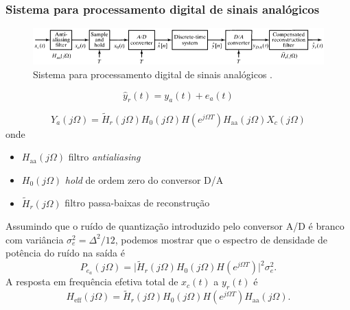 \begin{frame}[allowframebreaks]
  \frametitle{Sistema para processamento digital de sinais analógicos}
  \begin{figure}[h!]
  \centering
  \includegraphics[width=\textwidth]{images/oppenheim_fig441b.png}
  \caption{Sistema para processamento digital de sinais analógicos \citep{oppenheim2009}.}
  \label{fig:oppenheim_fig441b}
  \end{figure}

  \begin{equation}
  \hat{y}_r (t) = y_a (t) + e_a (t)
  \end{equation}
  
  \begin{equation}
  Y_a(j\Omega) = \tilde{H}_r(j\Omega) H_0(j\Omega) H(e^{j\Omega T}) H_{\text{aa}}(j\Omega) X_c(j\Omega) 
  \end{equation}
  onde 
  \begin{itemize}
  \item $H_{\text{aa}}(j\Omega)$ filtro \textit{antialiasing}
  \item $H_0(j\Omega)$ \textit{hold} de ordem zero do conversor D/A 
  \item $\tilde{H}_r(j\Omega)$ filtro passa-baixas de reconstrução 
  \end{itemize}

  
  Assumindo que o ruído de quantização introduzido pelo conversor A/D é branco com
  variância $\sigma_e^2 = \Delta^2/12$, podemos mostrar que o espectro de densidade de potência do ruído na saída é
  \begin{equation}
  P_{e_a} (j\Omega) = \vert \tilde{H}_r(j\Omega) H_0(j\Omega) H(e^{j\Omega T}) \vert^2 \sigma_e^2 .
  \end{equation}
  A resposta em frequência efetiva total de $x_c(t)$ a $y_r(t)$ é
  \begin{equation}
  H_{\text{eff}}(j\Omega) = \tilde{H}_r(j\Omega) H_0(j\Omega) H(e^{j\Omega T}) H_{\text{aa}}(j\Omega) .
  \end{equation}
\end{frame}







